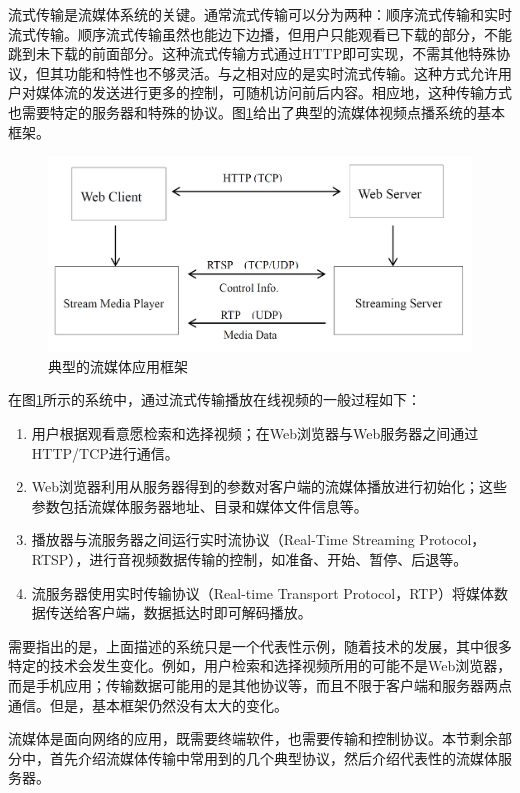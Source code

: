 流式传输是流媒体系统的关键。通常流式传输可以分为两种：顺序流式传输和实时流式传输。顺序流式传输虽然也能边下边播，但用户只能观看已下载的部分，不能跳到未下载的前面部分。这种流式传输方式通过HTTP即可实现，不需其他特殊协议，但其功能和特性也不够灵活。与之相对应的是实时流式传输。这种方式允许用户对媒体流的发送进行更多的控制，可随机访问前后内容。相应地，这种传输方式也需要特定的服务器和特殊的协议。图\ref{fig:10}给出了典型的流媒体视频点播系统的基本框架。

\begin{figure}[h]
	\centering
	\includegraphics[width = 1.0\linewidth]{clip/10.png}
	\caption{典型的流媒体应用框架\label{fig:10}}
\end{figure}

在图\ref{fig:10}所示的系统中，通过流式传输播放在线视频的一般过程如下：
\begin{enumerate}
\item 用户根据观看意愿检索和选择视频；在Web浏览器与Web服务器之间通过HTTP/TCP进行通信。
\item Web浏览器利用从服务器得到的参数对客户端的流媒体播放进行初始化；这些参数包括流媒体服务器地址、目录和媒体文件信息等。
\item 播放器与流服务器之间运行实时流协议（Real-Time Streaming Protocol，RTSP）\supercite{RTSP}，进行音视频数据传输的控制，如准备、开始、暂停、后退等。
\item 流服务器使用实时传输协议（Real-time Transport Protocol，RTP）\supercite{RTP}将媒体数据传送给客户端，数据抵达时即可解码播放。
\end{enumerate}

需要指出的是，上面描述的系统只是一个代表性示例，随着技术的发展，其中很多特定的技术会发生变化。例如，用户检索和选择视频所用的可能不是Web浏览器，而是手机应用；传输数据可能用的是其他协议等，而且不限于客户端和服务器两点通信。但是，基本框架仍然没有太大的变化。

流媒体是面向网络的应用，既需要终端软件，也需要传输和控制协议。本节剩余部分中，首先介绍流媒体传输中常用到的几个典型协议，然后介绍代表性的流媒体服务器。

